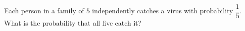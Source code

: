 Each person in a family of \(5\) independently catches a virus with probability \(\dfrac{1}{5}\). What is the probability that all five catch it?
